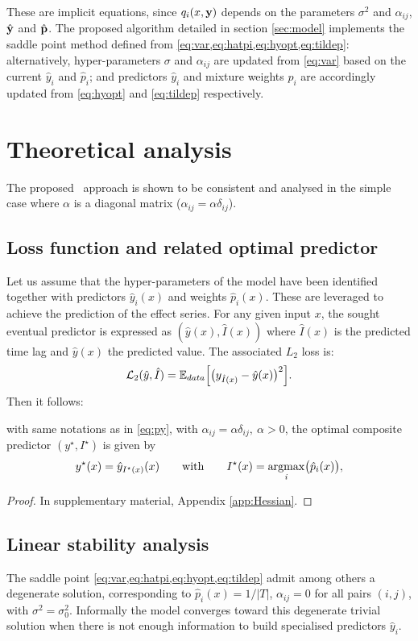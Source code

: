These are implicit equations, since $q_i(x,{\bf y})$ depends on the parameters $\sigma^2$ and $\alpha_{ij}$, 
$\hat {\bf y}$ and $\hat{\bf p}$.
The proposed algorithm detailed in section \ref{sec:model} implements the saddle point method defined from 
\cref{eq:var,eq:hatpi,eq:hyopt,eq:tildep}: alternatively, hyper-parameters $\sigma$ and $\alpha_{ij}$ are 
updated from \cref{eq:var} based on the current $\hat y_i$ and $\hat p_i$; and predictors $\hat y_i$ and 
mixture weights $\hat p_i$ are accordingly updated from \cref{eq:hyopt} and \cref{eq:tildep} respectively. 

\section{Theoretical analysis}\label{sec:dtlrtheory}
The proposed \XX\ approach is shown to be consistent and analysed in the simple case  where $\alpha$ is a diagonal matrix ($\alpha_{ij} = \alpha\delta_{ij}$).

\subsection{Loss function and related optimal predictor}\label{sec:prop}
Let us assume that the hyper-parameters of the model have been identified together with predictors $\hat  y_i(x)$ and weights $\hat p_i(x)$. These are leveraged to achieve the prediction of the effect series. 
For any given input $x$, the sought eventual predictor is expressed as $(\hat y(x),\hat I(x))$ where $\hat I(x)$ is the predicted time lag %
and $\hat y(x)$ the 
predicted value. The associated $L_2$ loss is: 
\begin{equation}\label{eq:orloss}
{\cal L}_2(\hat y,\hat I) = {\mathbb E}_{data}\Bigl[\bigl(y_{\hat I(x)}-\hat y(x)\bigr)^2\Bigr]. 
\end{equation}
Then it follows:
\begin{prop}\label{prop:opred}
with same notations as in \cref{eq:py}, with $\alpha_{ij} = \alpha\delta_{ij},\ \alpha>0$, the optimal composite predictor 
$(y^\star,I^\star)$ is given by
\[
y^\star(x) = \hat y_{I^\star(x)}(x)\qquad\text{with}\qquad I^\star(x) = \operatorname*{argmax}_{i} \bigl(\hat p_i(x)\bigr), 
\]
\end{prop}
\begin{proof}
In supplementary material, Appendix \ref{app:Hessian}.
\end{proof}

\subsection{Linear stability analysis}\label{sec:stability}
The saddle point \cref{eq:var,eq:hatpi,eq:hyopt,eq:tildep} admit among others a degenerate solution, corresponding 
to $\hat p_i(x) = 1/\vert T\vert$, $\alpha_{ij}=0$ for all pairs $(i,j)$, with $\sigma^2=\sigma_0^2$. Informally the model converges toward this degenerate trivial solution when there is not enough information to build specialised predictors $\hat y_i$. 


